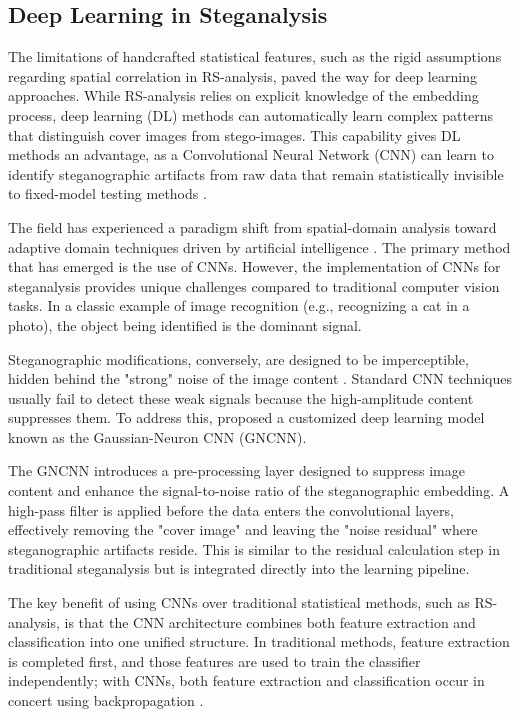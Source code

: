 \subsection{Deep Learning in Steganalysis}
The limitations of handcrafted statistical features, such as the rigid assumptions regarding spatial correlation in RS-analysis, paved the way for deep learning approaches. 
While RS-analysis relies on explicit knowledge of the embedding process, deep learning (DL) methods can automatically learn complex patterns that distinguish cover images from stego-images. 
This capability gives DL methods an advantage, as a Convolutional Neural Network (CNN) can learn to identify steganographic artifacts from raw data that remain statistically invisible to fixed-model testing methods \cite{Farooq2024}.

The field has experienced a paradigm shift from spatial-domain analysis toward adaptive domain techniques driven by artificial intelligence \cite{Apau2024}. 
The primary method that has emerged is the use of CNNs. 
However, the implementation of CNNs for steganalysis provides unique challenges compared to traditional computer vision tasks. 
In a classic example of image recognition (e.g., recognizing a cat in a photo), the object being identified is the dominant signal.

Steganographic modifications, conversely, are designed to be imperceptible, hidden behind the
"strong" noise of the image content \cite{Qian2015}. 
Standard CNN techniques usually fail to detect these weak signals because the high-amplitude content suppresses them. 
To address this, \textcite{Qian2015} proposed a customized deep learning model known as the Gaussian-Neuron CNN (GNCNN).

The GNCNN introduces a pre-processing layer designed to suppress image content and enhance the signal-to-noise ratio of the steganographic embedding. 
A high-pass filter is applied before the data enters the convolutional layers, effectively removing the "cover image" and leaving the "noise residual" where steganographic artifacts reside. 
This is similar to the residual calculation step in traditional steganalysis but is integrated directly into the learning pipeline.

The key benefit of using CNNs over traditional statistical methods, such as RS-analysis, is that the CNN architecture combines both feature extraction and classification into one unified structure. 
In traditional methods, feature extraction is completed first, and those features are used to train the classifier independently; with CNNs, both feature extraction and classification occur in concert using backpropagation \cite{Qian2015}.


